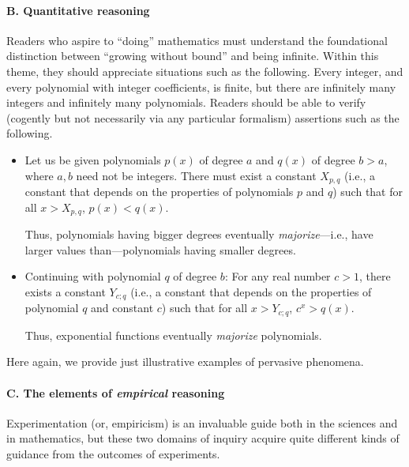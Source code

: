 \paragraph{B. Quantitative reasoning}

Readers who aspire to ``doing'' mathematics must understand the foundational distinction between ``growing without bound'' and being infinite.  Within this theme, they should appreciate situations such as the following.  Every integer, and every polynomial with integer coefficients, is finite, but there are infinitely many integers and infinitely many polynomials.  Readers should be able to verify (cogently but not necessarily via any particular formalism) assertions such as the following.
\begin{itemize}
\item
Let us be given polynomials $p(x)$ of degree $a$ and $q(x)$ of degree $b > a$, where $a, b$ need not be integers.  There must exist a constant $X_{p,q}$ (i.e., a constant that depends on the properties of polynomials $p$ and $q$) such that for all $x > X_{p,q}$, $p(x) < q(x)$.


\smallskip

Thus, polynomials having bigger degrees eventually {\em majorize}---i.e., have larger values than---polynomials having smaller degrees.

\item
Continuing with polynomial $q$ of degree $b$: For any real number $c > 1$, there exists a constant $Y_{c;q}$ (i.e., a constant that depends on the properties of polynomial $q$ and constant $c$) such that for all $x > Y_{c;q}$, $c^x > q(x)$.

\smallskip

Thus, exponential functions eventually {\em majorize} polynomials.
\end{itemize}
Here again, we provide just illustrative examples of pervasive phenomena.

\paragraph{C. The elements of {\em empirical} reasoning}

Experimentation (or, empiricism) is an invaluable guide both in the sciences and in mathematics, but these two domains of inquiry acquire quite different kinds of guidance from the outcomes of experiments.

